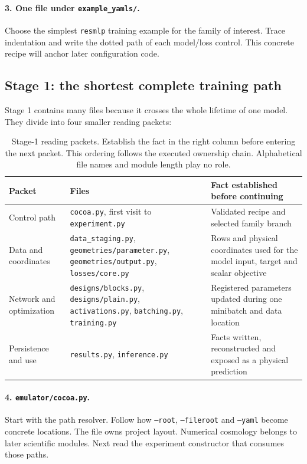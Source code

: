 \documentclass[10pt,aps,prd,twocolumn,nofootinbib]{revtex4-2}
\newcommand{\code}[1]{\texttt{#1}}
\begin{document}
\paragraph{3.  One file under \code{example\_yamls/}.}
Choose the simplest \code{resmlp} training example for the family of interest.
Trace indentation and write the dotted path of each model/loss control.  This
concrete recipe will anchor later configuration code.

\subsection{Stage 1: the shortest complete training path}

Stage 1 contains many files because it crosses the whole lifetime of one
model.  They divide into four smaller reading packets:

\begin{table}[t]
\centering
\begin{tabular}{p{}p{}p{}}
\toprule
Packet & Files & Fact established before continuing \\
\midrule
Control path & \code{cocoa.py}, first visit to \code{experiment.py} &
Validated recipe and selected family branch \\
Data and coordinates & \code{data\_staging.py}, \code{geometries/parameter.py},
\code{geometries/output.py}, \code{losses/core.py} &
Rows and physical coordinates used for the model input, target and scalar objective \\
Network and optimization & \code{designs/blocks.py}, \code{designs/plain.py},
\code{activations.py}, \code{batching.py}, \code{training.py} &
Registered parameters updated during one minibatch and data location \\
Persistence and use & \code{results.py}, \code{inference.py} &
Facts written, reconstructed and exposed as a physical prediction \\
\bottomrule
\end{tabular}
\caption{Stage-1 reading packets.  Establish the fact in the right column
before entering the next packet.  This ordering follows the executed
ownership chain.  Alphabetical file names and module length play no role.}
\label{tab:stage-one-packets}
\end{table}

\paragraph{4.  \code{emulator/cocoa.py}.}
Start with the path resolver.  Follow how \code{--root},
\code{--fileroot} and \code{--yaml} become concrete locations.  The file owns
project layout.  Numerical cosmology belongs to later scientific modules.
Next read the experiment constructor
that consumes those paths.
\end{document}
